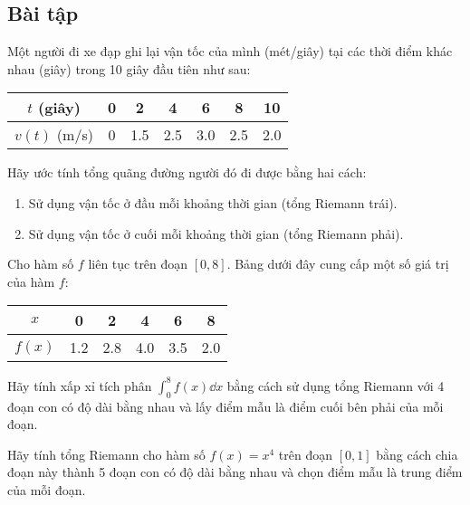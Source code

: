 \subsection{Bài tập}

\begin{exercise}
    Một người đi xe đạp ghi lại vận tốc của mình (mét/giây) tại các thời điểm khác nhau (giây) trong 10 giây đầu tiên như sau:
    \begin{center}
    \begin{tabular}{|c|c|c|c|c|c|c|}
        \hline
        $t$ (giây) & 0 & 2 & 4 & 6 & 8 & 10 \\
        \hline
        $v(t)$ (m/s) & 0 & 1.5 & 2.5 & 3.0 & 2.5 & 2.0 \\
        \hline
    \end{tabular}
    \end{center}
    Hãy ước tính tổng quãng đường người đó đi được bằng hai cách:
    \begin{enumerate}[label=(\alph*)]
        \item Sử dụng vận tốc ở đầu mỗi khoảng thời gian (tổng Riemann trái).
        \item Sử dụng vận tốc ở cuối mỗi khoảng thời gian (tổng Riemann phải).
    \end{enumerate}
\end{exercise}

\begin{exercise}
    Cho hàm số $f$ liên tục trên đoạn $[0, 8]$. Bảng dưới đây cung cấp một số giá trị của hàm $f$:
    \begin{center}
    \begin{tabular}{|c|c|c|c|c|c|}
        \hline
        $x$ & 0 & 2 & 4 & 6 & 8 \\
        \hline
        $f(x)$ & 1.2 & 2.8 & 4.0 & 3.5 & 2.0 \\
        \hline
    \end{tabular}
    \end{center}
    Hãy tính xấp xỉ tích phân $\int_{0}^{8} f(x) \dd x$ bằng cách sử dụng tổng Riemann với 4 đoạn con có độ dài bằng nhau và lấy điểm mẫu là điểm cuối bên phải của mỗi đoạn.
\end{exercise}

\begin{exercise}
    Hãy tính tổng Riemann cho hàm số $f(x) = x^4$ trên đoạn $[0, 1]$ bằng cách chia đoạn này thành 5 đoạn con có độ dài bằng nhau và chọn điểm mẫu là trung điểm của mỗi đoạn.
\end{exercise}

